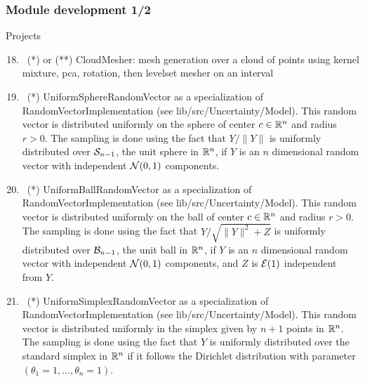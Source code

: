 \documentclass[8pt]{beamer}
\begin{document}
\begin{frame}
  \frametitle{Module development 1/2}
  \begin{block}{Projects}
    \begin{enumerate}
      \setcounter{enumi}{17}
    \item~(*) or (**) \alert{\ttfamily CloudMesher}: mesh generation over a cloud of points using kernel mixture, pca, rotation, then levelset mesher on an interval
    \item~(*) \alert{\ttfamily UniformSphereRandomVector} as a specialization of {\ttfamily RandomVectorImplementation} (see {\ttfamily lib/src/Uncertainty/Model}). This random vector is distributed uniformly on the sphere of center $c\in{\mathbb R}^n$ and radius $r>0$. The sampling is done using the fact that $Y/\|Y\|$ is uniformly distributed over ${\mathcal S}_{n-1}$, the unit sphere in ${\mathbb R}^n$, if $Y$ is an $n$ dimensional random vector with independent ${\mathcal N}(0,1)$ components.
    \item~(*) \alert{\ttfamily UniformBallRandomVector} as a specialization of {\ttfamily RandomVectorImplementation} (see {\ttfamily lib/src/Uncertainty/Model}). This random vector is distributed uniformly on the ball of center $c\in{\mathbb R}^n$ and radius $r>0$. The sampling is done using the fact that $Y/\sqrt{\|Y\|^2+Z}$ is uniformly distributed over ${\mathcal B}_{n-1}$, the unit ball in ${\mathbb R}^n$, if $Y$ is an $n$ dimensional random vector with independent ${\mathcal N}(0,1)$ components, and $Z$ is ${\mathcal E}(1)$ independent from $Y$.
    \item~(*) \alert{\ttfamily UniformSimplexRandomVector} as a specialization of {\ttfamily RandomVectorImplementation} (see {\ttfamily lib/src/Uncertainty/Model}). This random vector is distributed uniformly in the simplex given by $n+1$ points in ${\mathbb R}^n$. The sampling is done using the fact that $Y$ is uniformly distributed over the standard simplex in ${\mathbb R}^n$ if it follows the Dirichlet distribution with parameter $(\theta_1=1,\dots,\theta_n=1)$.
    \end{enumerate}
  \end{block}
\end{frame}
\end{document}
